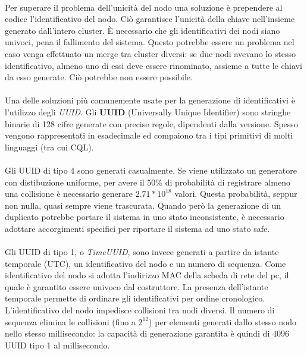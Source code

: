 \documentclass{article}
\begin{document}
\paragraph{} Per superare il problema dell'unicità del nodo una soluzione è prependere al codice l'identificativo del nodo. Ciò garantisce l'unicità della chiave nell'insieme generato dall'intero cluster. È necessario che gli identificativi dei nodi siano univoci, pena il fallimento del sistema. Questo potrebbe essere un problema nel caso venga effettuato un merge tra cluster diversi: se due nodi avevano lo stesso identificativo, almeno uno di essi deve essere rinominato, assieme a tutte le chiavi da esso generate. Ciò potrebbe non essere possibile.  

\paragraph{} Una delle soluzioni più comunemente usate per la generazione di identificativi è l'utilizzo degli \emph{UUID}. Gli \textbf{UUID} (Universally Unique Identifier) sono stringhe binarie di 128 cifre generate con precise regole, dipendenti dalla versione. Spesso vengono rappresentati in esadecimale ed compaiono tra i tipi primitivi di molti linguaggi (tra cui CQL).

\paragraph{} Gli UUID di tipo 4 sono generati casualmente. Se viene utilizzato un generatore con distibuzione uniforme, per avere il 50\% di probabilità di registrare almeno una collisione è necessario generare $2.71*10^{18}$ valori. Questa probabilità, seppur non nulla, quasi sempre viene trascurata. Quando però la generazione di un duplicato potrebbe portare il sistema in uno stato inconsistente, è necessario adottare accorgimenti specifici per riportare il sistema ad uno stato safe. 

\paragraph{} Gli UUID di tipo 1, o \emph{TimeUUID}, sono invece generati a partire da istante temporale (UTC), un identificativo del nodo e un numero di sequenza. Come identificativo del nodo si adotta l'indirizzo MAC della scheda di rete del pc, il quale è garantito essere univoco dal costruttore. La presenza dell'istante temporale permette di ordinare gli identificativi per ordine cronologico. L'identificativo del nodo impedisce collisioni tra nodi diversi. Il numero di sequenza elimina le collisioni (fino a $2^{12}$) per elementi generati dallo stesso nodo nello stesso millisecondo: la capacità di generazione garantita è quindi di 4096 UUID tipo 1 al millisecondo. 
\end{document}
